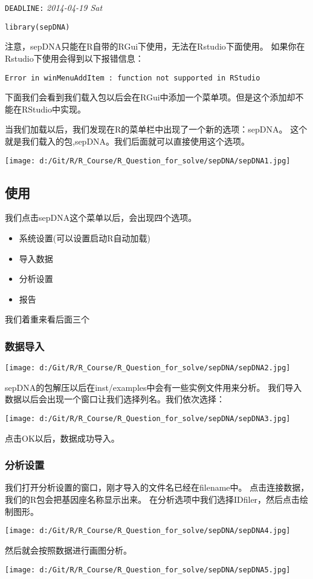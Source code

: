\documentclass{ctexart}
\begin{document}
   \texttt{DEADLINE:} \textit{2014-04-19 Sat}

\begin{lstlisting}
library(sepDNA)
\end{lstlisting}
注意，sepDNA只能在R自带的RGui下使用，无法在Rstudio下面使用。
如果你在Rstudio下使用会得到以下报错信息：

\begin{verbatim}
Error in winMenuAddItem : function not supported in RStudio
\end{verbatim}
下面我们会看到我们载入包以后会在RGui中添加一个菜单项。但是这个添加却不能在RStudio中实现。

当我们加载以后，我们发现在R的菜单栏中出现了一个新的选项：sepDNA。
这个就是我们载入的包,sepDNA。我们后面就可以直接使用这个选项。

\texttt{[image: d:/Git/R/R\_Course/R\_Question\_for\_solve/sepDNA/sepDNA1.jpg]}
\subsection{使用}
\label{sec-3-2}

我们点击sepDNA这个菜单以后，会出现四个选项。
\begin{itemize}
\item 系统设置(可以设置启动R自动加载)
\item 导入数据
\item 分析设置
\item 报告
\end{itemize}

我们着重来看后面三个
\subsubsection{数据导入}
\label{sec-3-2-1}

\texttt{[image: d:/Git/R/R\_Course/R\_Question\_for\_solve/sepDNA/sepDNA2.jpg]}

sepDNA的包解压以后在inst/examples中会有一些实例文件用来分析。
我们导入数据以后会出现一个窗口让我们选择列名。我们依次选择：

\texttt{[image: d:/Git/R/R\_Course/R\_Question\_for\_solve/sepDNA/sepDNA3.jpg]}

点击OK以后，数据成功导入。
\subsubsection{分析设置}
\label{sec-3-2-2}

我们打开分析设置的窗口，刚才导入的文件名已经在filename中。
点击连接数据，我们的R包会把基因座名称显示出来。
在分析选项中我们选择IDfiler，然后点击绘制图形。

\texttt{[image: d:/Git/R/R\_Course/R\_Question\_for\_solve/sepDNA/sepDNA4.jpg]}

然后就会按照数据进行画图分析。

\texttt{[image: d:/Git/R/R\_Course/R\_Question\_for\_solve/sepDNA/sepDNA5.jpg]}
\end{document}
